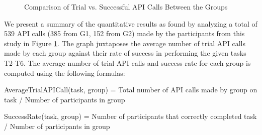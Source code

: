 \documentclass[conference]{IEEEtran}
\begin{document}
\begin{figure}


\caption{Comparison of Trial vs. Successful API Calls Between the Groups}
\label{graph:productivity}
\end{figure}

We present a summary of the quantitative results as found by analyzing a total of 539 API calls (385 from G1, 152 from G2) made by the participants from this study in Figure \ref{graph:productivity}. The graph juxtaposes the average number of trial API calls made by each group against their rate of success in performing the given tasks T2-T6. The average number of trial API calls and success rate for each group is computed using the following formulas:

AverageTrialAPICall(task, group) = Total number of API calls made by group on task / Number of participants in group

SuccessRate(task, group) = Number of participants that correctly completed task / Number of participants in group
\end{document}
